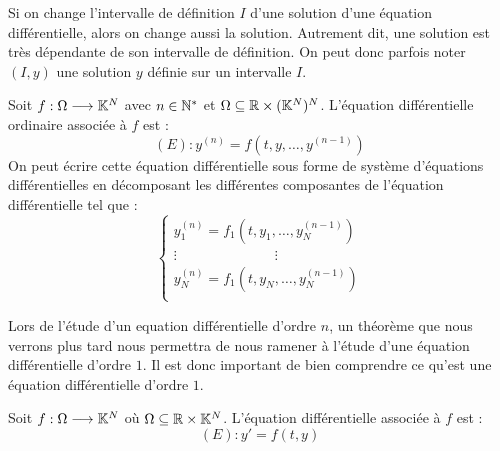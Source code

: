 \begin{remark}
    Si on change l'intervalle de définition $I$ d'une solution d'une équation différentielle, 
    alors on change aussi la solution. Autrement dit, une solution est très dépendante de son intervalle 
    de définition. On peut donc parfois noter $(I,y)$ une solution $y$ définie sur un intervalle $I$. 
\end{remark}

\begin{definition}
    Soit $f : \Omega \longrightarrow \mathbb{K}^N$ avec $n \in \mathbb{N}^*$ et $\Omega \subseteq \mathbb{R} \times (\mathbb{K}^N)^N$. 
    L'équation différentielle ordinaire associée à $f$ est :
        \[ (E) : y^{(n)} = f(t,y,\dots,y^{(n-1)}) \] 
    On peut écrire cette équation différentielle sous forme de système d'équations différentielles 
    en décomposant les différentes composantes de l'équation différentielle tel que :
        \[
            \begin{cases}
                y_1^{(n)} = f_1(t,y_1, \dots, y_N^{(n-1)}) \\ 
                \vdots \quad  \quad \quad \quad \quad \quad \quad \vdots \\ 
                y_N^{(n)} = f_1(t,y_N, \dots, y_N^{(n-1)}) \\ 
            \end{cases} 
        \]
\end{definition}

Lors de l'étude d'un equation différentielle d'ordre $n$, un théorème que nous verrons plus tard nous permettra
de nous ramener à l'étude d'une équation différentielle d'ordre $1$. 
Il est donc important de bien comprendre ce qu'est une équation différentielle d'ordre $1$. 

\begin{remark}
    Soit $f : \Omega \longrightarrow \mathbb{K}^N $ où $ \Omega \subseteq \mathbb{R} \times \mathbb{K}^N$. 
    L'équation différentielle associée à $f$ est :
        \[ (E) : y' = f(t,y) \] 
\end{remark}

